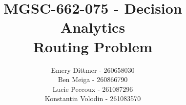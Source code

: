 \documentclass[11pt, oneside, titlepage]{article}
\title{MGSC-662-075 - Decision Analytics \\ 
    Routing Problem}
\author{Emery Dittmer - 260658030\\ 
    Ben Meiga - 260866790 \\ 
    Lucie Peccoux - 261087296 \\ 
    Konstantin Volodin - 261083570}
\begin{document}
\renewcommand\refname{REFERENCES} 
\baselineskip=15pt
\begin{minipage}{\textwidth}
    
\end{minipage}
\newpage

\tableofcontents
\thispagestyle{empty} %
\clearpage\setcounter{page}{1} %

\newpage










\newpage
\printbibliography
\end{document}
